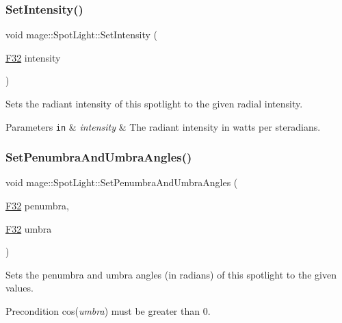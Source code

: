 \subsubsection{\texorpdfstring{Set\+Intensity()}{SetIntensity()}}
{\footnotesize\ttfamily void mage\+::\+Spot\+Light\+::\+Set\+Intensity (\begin{DoxyParamCaption}\item[{\hyperlink{namespacemage_aa97e833b45f06d60a0a9c4fc22ae02c0}{F32}}]{intensity }\end{DoxyParamCaption})\hspace{0.3cm}{\ttfamily [noexcept]}}

Sets the radiant intensity of this spotlight to the given radial intensity.


\begin{DoxyParams}[1]{Parameters}
\mbox{\tt in}  & {\em intensity} & The radiant intensity in watts per steradians. \\
\hline
\end{DoxyParams}
\hypertarget{classmage_1_1_spot_light_a7510d29df641a651bab5f3d393e18b60}{}\label{classmage_1_1_spot_light_a7510d29df641a651bab5f3d393e18b60} 
\subsubsection{\texorpdfstring{Set\+Penumbra\+And\+Umbra\+Angles()}{SetPenumbraAndUmbraAngles()}}
{\footnotesize\ttfamily void mage\+::\+Spot\+Light\+::\+Set\+Penumbra\+And\+Umbra\+Angles (\begin{DoxyParamCaption}\item[{\hyperlink{namespacemage_aa97e833b45f06d60a0a9c4fc22ae02c0}{F32}}]{penumbra,  }\item[{\hyperlink{namespacemage_aa97e833b45f06d60a0a9c4fc22ae02c0}{F32}}]{umbra }\end{DoxyParamCaption})\hspace{0.3cm}{\ttfamily [noexcept]}}

Sets the penumbra and umbra angles (in radians) of this spotlight to the given values.

\begin{DoxyPrecond}{Precondition}
cos({\itshape umbra}) must be greater than 0. 
\end{DoxyPrecond}

